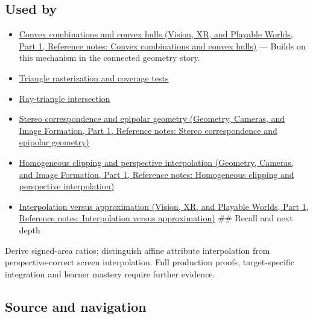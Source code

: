 \subsection{Used by}\label{appendix-02b9d9a81dca-used-by}

\hypertarget{appendix-02b9d9a81dca-used-by}{}

\begin{itemize}
\item
  \href{../07-Vision-XR-and-Playable-Worlds-P01/main.pdf\#nameddest=appendix-0026ec42c9d5}{Convex combinations and convex hulls (Vision, XR, and Playable Worlds, Part 1, Reference notes: Convex combinations and convex hulls)} --- Builds on this mechanism in the connected geometry story.
\item
  \hyperref[appendix-ed3f9bc298fe]{Triangle rasterization and coverage tests}
\item
  \hyperref[appendix-47ac1bd6d144]{Ray-triangle intersection}
\item
  \href{../03-Geometry-Cameras-and-Image-Formation-P01/main.pdf\#nameddest=appendix-c4e98b6e4001}{Stereo correspondence and epipolar geometry (Geometry, Cameras, and Image Formation, Part 1, Reference notes: Stereo correspondence and epipolar geometry)}
\item
  \href{../03-Geometry-Cameras-and-Image-Formation-P01/main.pdf\#nameddest=appendix-40426e4b2103}{Homogeneous clipping and perspective interpolation (Geometry, Cameras, and Image Formation, Part 1, Reference notes: Homogeneous clipping and perspective interpolation)}
\item
  \href{../07-Vision-XR-and-Playable-Worlds-P01/main.pdf\#nameddest=appendix-0c2a5f69851e}{Interpolation versus approximation (Vision, XR, and Playable Worlds, Part 1, Reference notes: Interpolation versus approximation)} \#\# Recall and next depth
\end{itemize}

Derive signed-area ratios; distinguish affine attribute interpolation from perspective-correct screen interpolation. Full production proofs, target-specific integration and learner mastery require further evidence.

\subsection{Source and navigation}\label{appendix-02b9d9a81dca-source-and-navigation}

\hypertarget{appendix-02b9d9a81dca-source-and-navigation}{}

